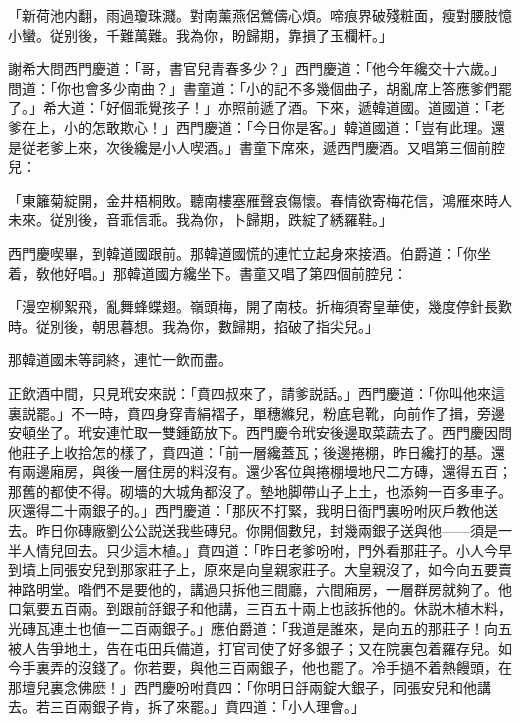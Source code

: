 \begin{myquote}
「新荷池内翻，雨過瓊珠濺。對南薰燕侶鶯儔心煩。啼痕界破殘粧面，瘦對腰肢憶小蠻。従别後，千難萬難。我為你，盼歸期，靠損了玉欄杆。」
\end{myquote}

謝希大問西門慶道：「哥，書官兒青春多少？」西門慶道：「他今年纔交十六歲。」問道：「你也會多少南曲？」書童道：「小的記不多幾個曲子，胡亂席上答應爹們罷了。」希大道：「好個乖覺孩子！」亦照前遞了酒。下來，遞韓道國。道國道：「老爹在上，小的怎敢欺心！」西門慶道：「今日你是客。」韓道國道：「豈有此理。還是従老爹上來，次後纔是小人喫酒。」書童下席來，遞西門慶酒。又唱第三個前腔兒：

\begin{myquote}
「東籬菊綻開，金井梧桐敗。聽南樓塞雁聲哀傷懷。春情欲寄梅花信，鴻雁來時人未來。従別後，音乖信乖。我為你，卜歸期，跌綻了綉羅鞋。」
\end{myquote}

西門慶喫畢，到韓道國跟前。那韓道國慌的連忙立起身來接酒。伯爵道：「你坐着，敎他好唱。」那韓道國方纔坐下。書童又唱了第四個前腔兒：

\begin{myquote}
「漫空柳絮飛，亂舞蜂蝶翅。嶺頭梅，開了南枝。折梅須寄皇華使，幾度停針長歎時。従別後，朝思暮想。我為你，數歸期，掐破了指尖兒。」
\end{myquote}

那韓道國未等詞終，連忙一飲而盡。

正飲酒中間，只見玳安來説：「賁四叔來了，請爹説話。」西門慶道：「你叫他來這裏説罷。」不一時，賁四身穿青絹褶子，單穗縧兒，粉底皂靴，向前作了揖，旁邊安頓坐了。玳安連忙取一雙鍾筯放下。西門慶令玳安後邊取菜蔬去了。西門慶因問他莊子上收拾怎的樣了，賁四道：「前一層纔蓋瓦；後邊捲棚，昨日纔打的基。還有兩邊廂房，與後一層住房的料沒有。還少客位與捲棚墁地尺二方磚，還得五百；那舊的都使不得。砌墻的大城角都沒了。墊地脚帶山子上土，也添夠一百多車子。灰還得二十兩銀子的。」西門慶道：「那灰不打緊，我明日衙門裏吩咐灰戶教他送去。昨日你磚廠劉公公説送我些磚兒。你開個數兒，封幾兩銀子送與他——須是一半人情兒回去。只少這木植。」賁四道：「昨日老爹吩咐，門外看那莊子。小人今早到墳上同張安兒到那家莊子上，原來是向皇親家莊子。大皇親沒了，如今向五要賣神路明堂。喒們不是要他的，講過只拆他三間廳，六間廂房，一層群房就夠了。他口氣要五百兩。到跟前㧱銀子和他講，三百五十兩上也該拆他的。休説木植木料，光磚瓦連土也値一二百兩銀子。」應伯爵道：「我道是誰來，是向五的那莊子！向五被人告爭地土，告在屯田兵備道，打官司使了好多銀子；又在院裏包着羅存兒。如今手裏弄的沒錢了。你若要，與他三百兩銀子，他也罷了。冷手撾不着熱饅頭，在那壇兒裏念佛麽！」西門慶吩咐賁四：「你明日㧱兩錠大銀子，同張安兒和他講去。若三百兩銀子肯，拆了來罷。」賁四道：「小人理會。」


